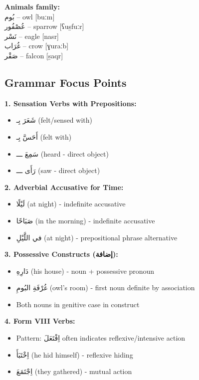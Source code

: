 \documentclass[letter,12pt]{article}
\begin{document}
\begin{multicols}{2}
\textbf{Animals family:}\\
\textarabic{بُوم} – owl [buːm]\\
\textarabic{عُصْفُور} – sparrow [ʕus̱fuːr]\\
\textarabic{نَسْر} – eagle [nasr]\\
\textarabic{غُرَاب} – crow [ɣuraːb]\\
\textarabic{صَقْر} – falcon [s̱aqr]
\end{multicols}

\subsection{Grammar Focus Points}

\begin{tcolorbox}[colback=white,colframe=headercolor,title=\textbf{Key Grammatical Constructions}]
\textbf{1. Sensation Verbs with Prepositions:}
\begin{itemize}
\item \textarabic{شَعَرَ بِـ} (felt/sensed with)
\item \textarabic{أَحَسَّ بِـ} (felt with)
\item \textarabic{سَمِعَ ـــ} (heard - direct object)
\item \textarabic{رَأَى ـــ} (saw - direct object)
\end{itemize}

\textbf{2. Adverbial Accusative for Time:}
\begin{itemize}
\item \textarabic{لَيْلًا} (at night) - indefinite accusative
\item \textarabic{صَبَاحًا} (in the morning) - indefinite accusative
\item \textarabic{في اللَّيْلِ} (at night) - prepositional phrase alternative
\end{itemize}

\textbf{3. Possessive Constructs (إضافة):}
\begin{itemize}
\item \textarabic{دَارِهِ} (his house) - noun + possessive pronoun
\item \textarabic{غُرْفَةِ البُومِ} (owl's room) - first noun definite by association
\item Both nouns in genitive case in construct
\end{itemize}

\textbf{4. Form VIII Verbs:}
\begin{itemize}
\item Pattern: \textarabic{اِفْتَعَلَ} often indicates reflexive/intensive action
\item \textarabic{اِخْتَبَأَ} (he hid himself) - reflexive hiding
\item \textarabic{اِجْتَمَعَ} (they gathered) - mutual action
\end{itemize}
\end{tcolorbox}
\end{document}
